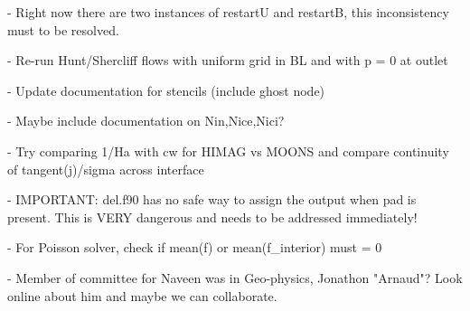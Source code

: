 \documentclass[11pt]{article}
\begin{document}
- Right now there are two instances of restartU and restartB, this inconsistency must to be resolved.

- Re-run Hunt/Shercliff flows with uniform grid in BL and with p = 0 at outlet

- Update documentation for stencils (include ghost node)

- Maybe include documentation on Nin,Nice,Nici?

- Try comparing 1/Ha with cw for HIMAG vs MOONS and compare continuity of tangent(j)/sigma across interface

- IMPORTANT: del.f90 has no safe way to assign the output when pad is present. This is VERY dangerous and needs to be addressed immediately!

- For Poisson solver, check if mean(f) or mean(f\_interior) must = 0

- Member of committee for Naveen was in Geo-physics, Jonathon "Arnaud"? Look online about him and maybe we can collaborate.
\end{document}
